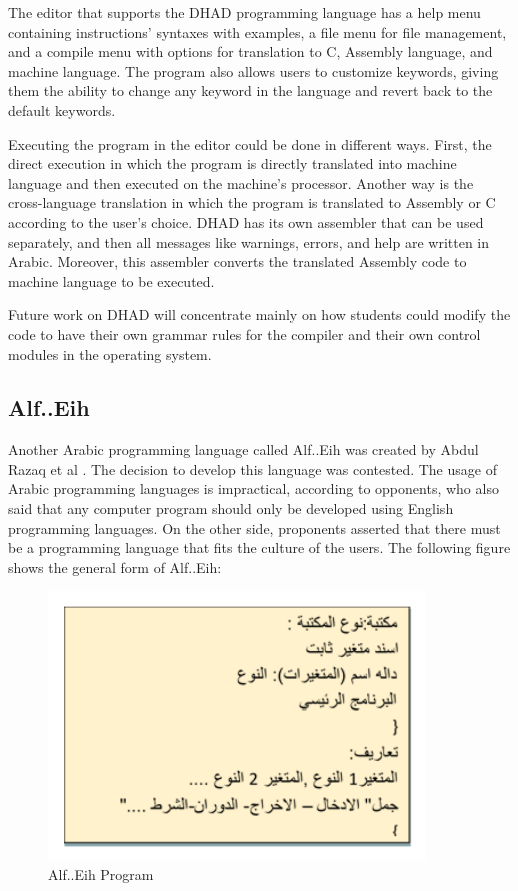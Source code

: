 The editor that supports the DHAD programming language has a help menu containing instructions' syntaxes with examples, a file menu for file management, and a compile menu with options for translation to C, Assembly language, and machine language. The program also allows users to customize keywords, giving them the ability to change any keyword in the language and revert back to the default keywords. 

Executing the program in the editor could be done in different ways. First, the direct execution in which the program is directly translated into machine language and then executed on the machine's processor. Another way is the cross-language translation in which the program is translated to Assembly or C according to the user's choice. DHAD has its own assembler that can be used separately, and then all messages like warnings, errors, and help are written in Arabic. Moreover, this assembler converts the translated Assembly code to machine language to be executed.

Future work on DHAD will concentrate mainly on how students could modify the code to have their own grammar rules for the compiler and their own control modules in the operating system.
\subsection{Alf..Eih}
Another Arabic programming language called Alf..Eih was created by Abdul Razaq et al \cite{razaq2019designing}. The decision to develop this language was contested. The usage of Arabic programming languages is impractical, according to opponents, who also said that any computer program should only be developed using English programming languages. On the other side, proponents asserted that there must be a programming language that fits the culture of the users. The following figure shows the general form of Alf..Eih:

\begin{figure}[H]
\centering
\includegraphics[width=10cm]{ch2-images/AlfEih.png}
\caption{Alf..Eih Program \cite{razaq2019designing}}
\label{fig:Alf..Eih Program}
\end{figure}

